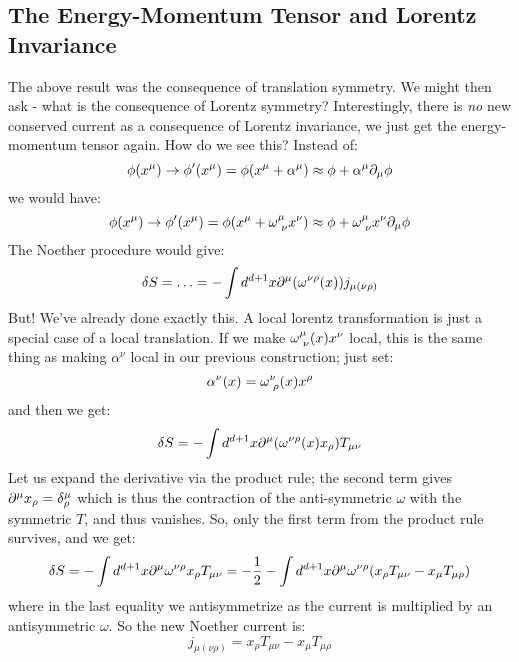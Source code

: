 \subsection{The Energy-Momentum Tensor and Lorentz Invariance}
The above result was the consequence of translation symmetry. We might then ask - what is the consequence of Lorentz symmetry? Interestingly, there is \emph{no} new conserved current as a consequence of Lorentz invariance, we just get the energy-momentum tensor again. How do we see this? Instead of:
\begin{equation}
    \phi(x^\mu) \to \phi'(x^\mu) = \phi(x^\mu + \alpha^\mu) \approx \phi + \alpha^\mu\partial_\mu \phi
\end{equation}
we would have:
\begin{equation}
    \phi(x^\mu) \to \phi'(x^\mu) = \phi(x^\mu + \omega^{\mu}_{\sp\nu} x^\nu) \approx \phi + \omega^{\mu}_{\sp\nu} x^\nu \p_\mu \phi
\end{equation}
The Noether procedure would give:
\begin{equation}
    \delta S = \ldots = -\int d^{d+1}x\partial^\mu (\omega^{\nu\rho}(x))j_{\mu(\nu\rho)}
\end{equation}
But! We've already done exactly this. A local lorentz transformation is just a special case of a local translation. If we make $\omega^{\mu}_{\sp\nu}(x)x^\nu$ local, this is the same thing as making $\alpha^\nu$ local in our previous construction; just set:
\begin{equation}
    \alpha^\nu(x) = \omega^{\nu}_{\sp\rho}(x)x^\rho
\end{equation}
and then we get:
\begin{equation}
    \delta S = -\int d^{d+1}x\partial^\mu(\omega^{\nu\rho}(x)x_\rho)T_{\mu\nu}
\end{equation}
Let us expand the derivative via the product rule; the second term gives $\partial^\mu x_\rho = \delta^{\mu}_\rho$ which is thus the contraction of the anti-symmetric $\omega$ with the symmetric $T$, and thus vanishes. So, only the first term from the product rule survives, and we get:
\begin{equation}
    \delta S = -\int d^{d+1}x \partial^\mu \omega^{\nu\rho} x_\rho T_{\mu\nu} = -\frac{1}{2} -\int d^{d+1}x \partial^\mu \omega^{\nu\rho}(x_\rho T_{\mu\nu} - x_\mu T_{\mu\rho})
\end{equation}
where in the last equality we antisymmetrize as the current is multiplied by an antisymmetric $\omega$.
So the new Noether current is:
\begin{equation}
    j_{\mu(\nu\rho)} = x_\rho T_{\mu\nu} - x_\mu T_{\mu\rho}
\end{equation}
